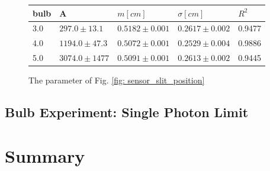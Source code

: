 \documentclass{article}
\begin{document}
\begin{figure}[H]
  \centering
  \begin{tabular}{  m{1cm}|m{2.5cm}|m{2.5cm}|m{2.5cm}| m{2.5cm}} 
    bulb& A& $m[cm]$& $\sigma[cm]$& $R^2$ \\ \hline 
    3.0& $297.0 \pm 13.1$& $0.5182 \pm 0.001$& $0.2617 \pm 0.002$& 0.9477\\ \hline 
    4.0& $1194.0 \pm 47.3$& $0.5072 \pm 0.001$& $0.2529 \pm 0.004$& 0.9886\\ \hline 
    5.0& $3074.0 \pm 1477$& $0.5091 \pm 0.001$& $0.2613 \pm 0.002$& 0.9445\\ \hline 
    
  \end{tabular}
  \caption{The parameter of Fig. \ref{fig: sensor_slit_position}}
  \label{fig: sensor_slit_position_statics}
\end{figure}


\subsection{Bulb Experiment: Single Photon Limit}

\section{Summary}






\end{document}
